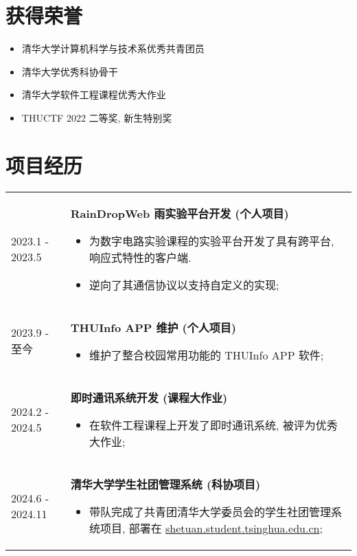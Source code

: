 \documentclass[a4paper, 10pt]{article}
\begin{document}
\section*{获得荣誉}
\begin{itemize}[left=0pt]
    \item 清华大学计算机科学与技术系优秀共青团员
    \item 清华大学优秀科协骨干
    \item 清华大学软件工程课程优秀大作业
    \item THUCTF 2022 二等奖, 新生特别奖
\end{itemize}

\section*{项目经历}
\noindent
\begin{tabular}{p{}p{}}
    2023.1 - 2023.5 & \textbf{RainDropWeb 雨实验平台开发 (个人项目)}
        \fontsize{8pt}{10pt}\selectfont
        \begin{itemize}[left=0pt,topsep=0pt,partopsep=0pt,parsep=0pt,itemsep=0pt]
            \item 为数字电路实验课程的实验平台开发了具有跨平台, 响应式特性的客户端.
            \item 逆向了其通信协议以支持自定义的实现;
        \end{itemize} \\

    2023.9 - 至今 & \textbf{THUInfo APP 维护 (个人项目)}
        \fontsize{8pt}{10pt}\selectfont
        \begin{itemize}[left=0pt,topsep=0pt,partopsep=0pt,parsep=0pt,itemsep=0pt]
            \item 维护了整合校园常用功能的 THUInfo APP 软件;
        \end{itemize} \\

    2024.2 - 2024.5 & \textbf{即时通讯系统开发 (课程大作业)}
        \fontsize{8pt}{10pt}\selectfont \begin{itemize}[left=0pt,topsep=0pt,partopsep=0pt,parsep=0pt,itemsep=0pt]
            \item 在软件工程课程上开发了即时通讯系统, 被评为优秀大作业;
        \end{itemize} \\

    2024.6 - 2024.11 & \textbf{清华大学学生社团管理系统 (科协项目)}
        \fontsize{8pt}{10pt}\selectfont \begin{itemize}[left=0pt,topsep=0pt,partopsep=0pt,parsep=0pt,itemsep=0pt]
            \item 带队完成了共青团清华大学委员会的学生社团管理系统项目, 部署在 \href{https://shetuan.student.tsinghua.edu.cn}{shetuan.student.tsinghua.edu.cn};
        \end{itemize} \\


\end{tabular}
\end{document}
